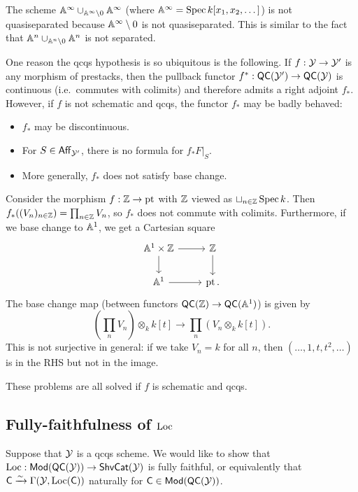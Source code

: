 \documentclass{article}
\begin{document}
\begin{ex}
	The scheme $\AA^\infty \cup_{\AA^\infty \setminus 0} \AA^\infty$ (where $\AA^\infty = \Spec k[x_1, x_2, \dots]$) is not quasiseparated because $\AA^\infty \setminus 0$ is not quasiseparated.
	This is similar to the fact that $\AA^n \cup_{\AA^n \setminus 0} \AA^n$ is not separated.
\end{ex}

One reason the qcqs hypothesis is so ubiquitous is the following.
If $f: \Yc \to \Yc'$ is any morphism of prestacks, then the pullback functor $f^*: \QC(\Yc') \to \QC(\Yc)$ is continuous (i.e.\ commutes with colimits) and therefore admits a right adjoint $f_*$.
However, if $f$ is not schematic and qcqs, the functor $f_*$ may be badly behaved:
\begin{itemize}
	\item $f_*$ may be discontinuous.
	\item For $S \in \Aff_{\Yc'}$, there is no formula for $f_* F|_S$.
	\item More generally, $f_*$ does not satisfy base change.
\end{itemize}

\begin{ex}
	Consider the morphism $f: \ZZ \to \pt$ with $\ZZ$ viewed as $\sqcup_{n \in \ZZ} \Spec k$.
	Then $f_*((V_n)_{n \in \ZZ}) = \prod_{n \in \ZZ} V_n$, so $f_*$ does not commute with colimits.
	Furthermore, if we base change to $\AA^1$, we get a Cartesian square
	\[
		\begin{tikzcd}
			\AA^1 \times \ZZ \rar \dar & \ZZ \dar \\
			\AA^1 \rar & \pt.
		\end{tikzcd}
	\]
	The base change map (between functors $\QC(\ZZ) \to \QC(\AA^1)$) is given by
	\[
		\left(\prod_n V_n\right) \otimes_k k[t] \to \prod_n (V_n \otimes_k k[t]).
	\]
	This is not surjective in general: if we take $V_n = k$ for all $n$, then $(\dots, 1, t, t^2, \dots)$ is in the RHS but not in the image.
\end{ex}

These problems are all solved if $f$ is schematic and qcqs.

\subsection{Fully-faithfulness of $\Loc$}

Suppose that $\Yc$ is a qcqs scheme.
We would like to show that $\Loc: \Mod(\QC(\Yc)) \to \ShvCat(\Yc)$ is fully faithful, or equivalently that $\Csf \xrightarrow{\sim} \Gamma(\Yc, \Loc(\Csf))$ naturally for $\Csf \in \Mod(\QC(\Yc))$.
\end{document}
